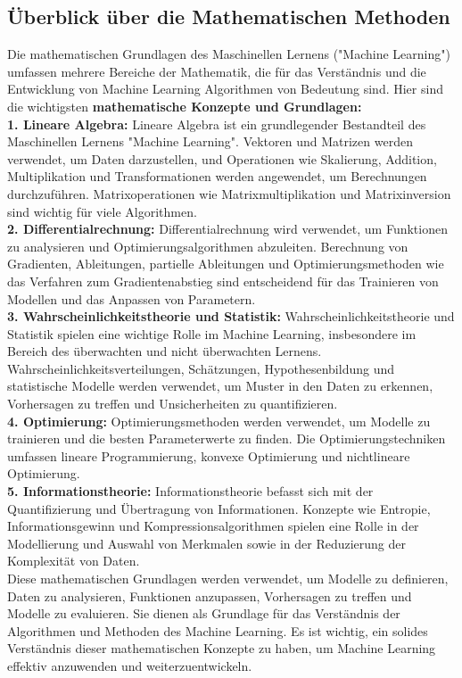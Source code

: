 \documentclass[12pt]{article}
\begin{document}
\subsection{Überblick über die Mathematischen Methoden}
Die mathematischen Grundlagen des Maschinellen Lernens ("Machine Learning") umfassen mehrere Bereiche der Mathematik, die für das Verständnis und die Entwicklung von Machine Learning Algorithmen von Bedeutung sind.
Hier sind die wichtigsten \textbf{mathematische Konzepte und Grundlagen:}\\[0.3cm]
%
\textbf{1. Lineare Algebra:} Lineare Algebra ist ein grundlegender Bestandteil des Maschinellen Lernens "Machine Learning". Vektoren und Matrizen werden verwendet, um Daten darzustellen, und Operationen wie Skalierung, Addition, Multiplikation und Transformationen werden angewendet, um Berechnungen durchzuführen. Matrixoperationen wie Matrixmultiplikation und Matrixinversion sind wichtig für viele Algorithmen.\\[0.2cm]
%
\textbf{2. Differentialrechnung:} Differentialrechnung wird verwendet, um Funktionen zu analysieren und Optimierungsalgorithmen abzuleiten. Berechnung von Gradienten, Ableitungen, partielle Ableitungen und Optimierungsmethoden wie das Verfahren zum Gradientenabstieg sind entscheidend für das Trainieren von Modellen und das Anpassen von Parametern.\\[0.2cm]
%
\textbf{3. Wahrscheinlichkeitstheorie und Statistik:} Wahrscheinlichkeitstheorie und Statistik spielen eine wichtige Rolle im Machine Learning, insbesondere im Bereich des überwachten und nicht überwachten Lernens. Wahrscheinlichkeitsverteilungen, Schätzungen, Hypothesenbildung und statistische Modelle werden verwendet, um Muster in den Daten zu erkennen, Vorhersagen zu treffen und Unsicherheiten zu quantifizieren.\\[0.2cm]
%
\textbf{4. Optimierung:} Optimierungsmethoden werden verwendet, um Modelle zu trainieren und die besten Parameterwerte zu finden. Die Optimierungstechniken umfassen lineare Programmierung, konvexe Optimierung und nichtlineare Optimierung.\\[0.2cm]
%
\textbf{5. Informationstheorie:} Informationstheorie befasst sich mit der Quantifizierung und Übertragung von Informationen. Konzepte wie Entropie, Informationsgewinn und Kompressionsalgorithmen spielen eine Rolle in der Modellierung und Auswahl von Merkmalen sowie in der Reduzierung der Komplexität von Daten.\\[0.2cm]
%
Diese mathematischen Grundlagen werden verwendet, um Modelle zu definieren, Daten zu analysieren, Funktionen anzupassen, Vorhersagen zu treffen und Modelle zu evaluieren. Sie dienen als Grundlage für das Verständnis der Algorithmen und Methoden des Machine Learning. Es ist wichtig, ein solides Verständnis dieser mathematischen Konzepte zu haben, um Machine Learning effektiv anzuwenden und weiterzuentwickeln.
%
\end{document}
